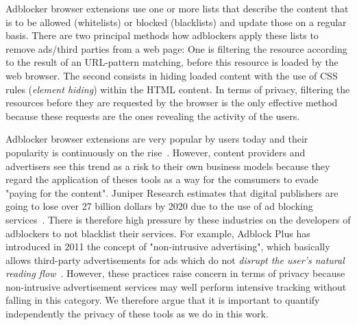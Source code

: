 \documentclass[compsoc, conference, letterpaper, 10pt, times]{IEEEtran}
\begin{document}
Adblocker browser extensions use one or more lists that describe the content that is to be allowed (whitelists) or blocked (blacklists) and update those on a regular basis. There are two principal methods how adblockers apply these lists to remove ads/third parties from a web page: One is filtering the resource according to the result of an URL-pattern matching, before this resource is loaded by the web browser. The second consists in hiding loaded content with the use of CSS rules (\textit{element hiding}) within the HTML content. In terms of privacy, filtering the resources before they are requested by the browser is the only effective method because these requests are the ones revealing the activity of the users.

Adblocker browser extensions are very popular by users today and their popularity is continuously on the rise~\cite{Mozilla_statistics,Google_statistics,pujol}. However, content providers and advertisers see this trend as a risk to their own business models because they regard the application of theses tools as a way for the comsumers to evade "paying for the content". Juniper Research estimates that digital publishers are going to lose over 27 billion dollars by 2020 due to the use of ad blocking services~\cite{Juniper_study}. There is therefore high pressure by these industries on the developers of adblockers to not blacklist their services. For example, Adblock Plus has introduced in 2011 the concept of "non-intrusive advertising", which basically allows third-party advertisements for ads which do not \emph{disrupt the user's natural reading flow}~\cite{acceptable_ads}. However, these practices raise concern in terms of privacy because non-intrusive advertisement services may well perform intensive tracking without falling in this category.  We therefore argue that it is important to quantify independently the privacy of these tools as we do in this work.






\end{document}

